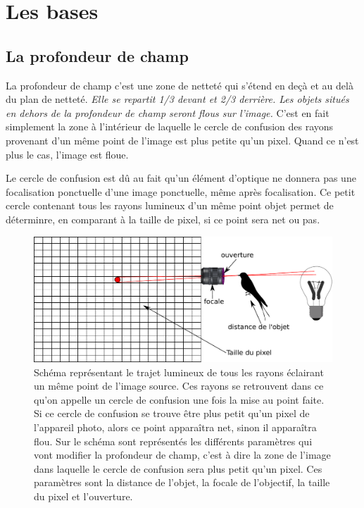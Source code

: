 \documentclass[a4paper,twoside]{article}
\begin{document}
\section{Les bases}
\subsection{La profondeur de champ}
La profondeur de champ c’est une zone de netteté qui s’étend en deçà et au delà du plan de netteté. \emph{Elle se repartit 1/3 devant et 2/3 derrière. Les objets situés en dehors de la profondeur de champ seront flous sur l’image.} C'est en fait simplement la zone à l'intérieur de laquelle le cercle de confusion des rayons provenant d'un même point de l'image est plus petite qu'un pixel. Quand ce n'est plus le cas, l'image est floue.

\begin{remarque}
Le cercle de confusion est dû au fait qu'un élément d'optique ne donnera pas une focalisation ponctuelle d'une image ponctuelle, même après focalisation. Ce petit cercle contenant tous les rayons lumineux d'un même point objet permet de déterminre, en comparant à la taille de pixel, si ce point sera net ou pas.
\end{remarque}


\begin{figure}[htb]
\centering
\includegraphics[width=0.5\linewidth]{figure/confusion_circle.pdf}
\caption{Schéma représentant le trajet lumineux de tous les rayons éclairant un même point de l'image source. Ces rayons se retrouvent dans ce qu'on appelle un cercle de confusion une fois la mise au point faite. Si ce cercle de confusion se trouve être plus petit qu'un pixel de l'appareil photo, alors ce point apparaîtra net, sinon il apparaîtra flou. Sur le schéma sont représentés les différents paramètres qui vont modifier la profondeur de champ, c'est à dire la zone de l'image dans laquelle le cercle de confusion sera plus petit qu'un pixel. Ces paramètres sont la distance de l'objet, la focale de l'objectif, la taille du pixel et l'ouverture.}
\end{figure}
\end{document}

